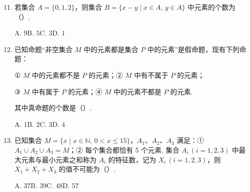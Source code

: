 \documentclass[a4paper,11pt]{article}
\begin{document}
\begin{enumerate}
\setcounter{enumi}{10}

\item 若集合 $A=\{0,1,2\}$，则集合 $B=\{x-y\mid x\in A,\,y\in A\}$ 中元素的个数为（\quad）.

A. $9$\qquad B. $5$\qquad C. $3$\qquad D. $1$


\ifanswer
\solbegin
{}
\solend

\fi

\item 已知命题“非空集合 $M$ 中的元素都是集合 $P$ 中的元素”是假命题，现有下列命题：

① $M$ 中的元素都不是 $P$ 的元素；\quad ② $M$ 中有不属于 $P$ 的元素；

③ $M$ 中有属于 $P$ 的元素；\quad ④ $M$ 中的元素不都是 $P$ 的元素.

其中真命题的个数是（\quad）.

A. $1$\qquad B. $2$\qquad C. $3$\qquad D. $4$


\ifanswer
\solbegin
{}
\solend

\fi

\item 已知集合 $M=\{x\mid x\in\mathbb{N},\,0<x\leqslant 15\}$，$A_1$、$A_2$、$A_3$ 满足：① $A_1\cup A_2\cup A_3=M$；② 每个集合都恰有 5 个元素. 集合 $A_i\,(i=1,2,3)$ 中最大元素与最小元素之和称为 $A_i$ 的特征数，记为 $X_i\,(i=1,2,3)$，则 $X_1+X_2+X_3$ 的值不可能为（\quad）.

A. $37$\qquad B. $39$\qquad C. $48$\qquad D. $57$



\end{enumerate}
\end{document}
